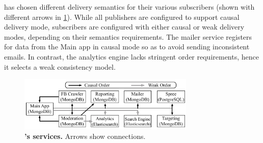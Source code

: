 \crowdtap has chosen different delivery semantics for their various subscribers
(shown with different arrows in \F\ref{fig:crowdtap-ecosystem}). While all
publishers are configured to support causal delivery mode, subscribers are
configured with either causal or weak delivery modes, depending on their
semantics requirements. The mailer service registers for data from
the Main app in causal mode so as to avoid sending inconsistent emails.
In contrast, the analytics engine lacks stringent order
requirements, hence it selects  a weak consistency model.

\begin{figure}[t]
\centering
   \includegraphics[width=3.3in]{figures/synapse/eco-crowdtap.pdf}
      \vspace{-20pt}
   \caption{\textbf{\crowdtap's services.} Arrows show \synapse connections.}
   \label{fig:crowdtap-ecosystem}
\end{figure}

